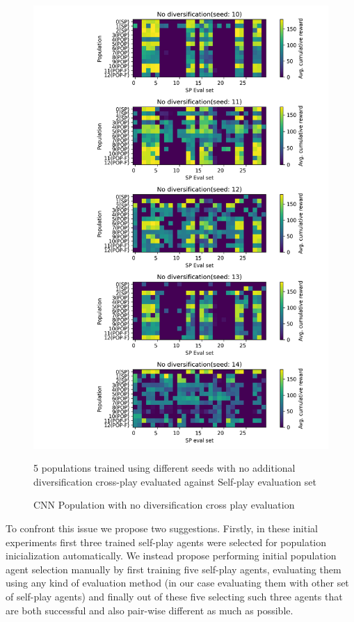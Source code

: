 \begin{figure}[!ht]
    \centering
    \includegraphics*[width=14cm]{../img/Forced_coordination_CNN_POP_NO_DIF(2).png}

    \caption{CNN Population with no diversification cross play evaluation}
    \label{CNNPopNoDiffBestInitFixation}
    \medskip
    \small 
    5 populations trained using different seeds with no additional diversification cross-play evaluated against Self-play evaluation set

\end{figure}

To confront this issue we propose two suggestions.
Firstly, in these initial experiments first three trained self-play agents were selected for population inicialization automatically.
We instead propose performing initial population agent selection manually by first training five self-play agents, evaluating them using any kind of evaluation method (in our case evaluating them with other set of self-play agents) and finally out of these five selecting such three agents that are both successful and also pair-wise different as much as possible.

